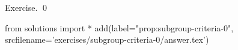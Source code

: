 
\begin{prop}
  \label{prop:subgroup-criteria-0}
  
\end{prop}
\proof
Exercise.
\qed
\begin{python0}
from solutions import *
add(label="prop:subgroup-criteria-0",
    srcfilename='exercises/subgroup-criteria-0/answer.tex') 
\end{python0}
